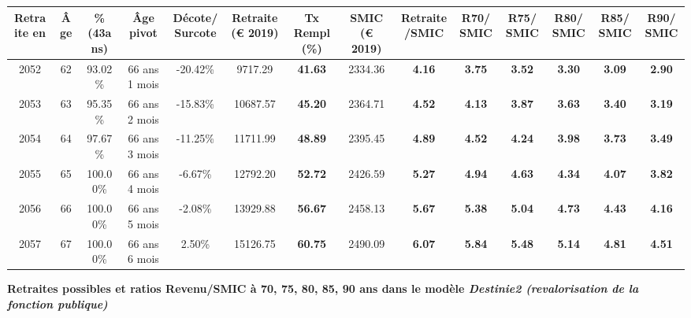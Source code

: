 \begin{adjustbox}{max width=\textwidth} 
\begin{tabular}[htb]{|c|c||c|c|c||c|c||c|c||c|c|c|c|c|} 
\hline 
 Retraite en &  Âge &  \%(43ans) &  Âge pivot &  Décote/Surcote &  Retraite (\euro{} 2019) &  Tx Rempl(\%) &  SMIC (\euro{} 2019) &  Retraite/SMIC &  R70/SMIC &  R75/SMIC &  R80/SMIC &  R85/SMIC &  R90/SMIC \\ 
\hline \hline 
 2052 &  62 &  93.02\% &  66 ans 1 mois &  -20.42\% &  9717.29 &  {\bf 41.63} &  2334.36 &  {\bf 4.16} &  {\bf 3.75} &  {\bf 3.52} &  {\bf 3.30} &  {\bf 3.09} &  {\bf 2.90} \\ 
\hline 
 2053 &  63 &  95.35\% &  66 ans 2 mois &  -15.83\% &  10687.57 &  {\bf 45.20} &  2364.71 &  {\bf 4.52} &  {\bf 4.13} &  {\bf 3.87} &  {\bf 3.63} &  {\bf 3.40} &  {\bf 3.19} \\ 
\hline 
 2054 &  64 &  97.67\% &  66 ans 3 mois &  -11.25\% &  11711.99 &  {\bf 48.89} &  2395.45 &  {\bf 4.89} &  {\bf 4.52} &  {\bf 4.24} &  {\bf 3.98} &  {\bf 3.73} &  {\bf 3.49} \\ 
\hline 
 2055 &  65 &  100.00\% &  66 ans 4 mois &  -6.67\% &  12792.20 &  {\bf 52.72} &  2426.59 &  {\bf 5.27} &  {\bf 4.94} &  {\bf 4.63} &  {\bf 4.34} &  {\bf 4.07} &  {\bf 3.82} \\ 
\hline 
 2056 &  66 &  100.00\% &  66 ans 5 mois &  -2.08\% &  13929.88 &  {\bf 56.67} &  2458.13 &  {\bf 5.67} &  {\bf 5.38} &  {\bf 5.04} &  {\bf 4.73} &  {\bf 4.43} &  {\bf 4.16} \\ 
\hline 
 2057 &  67 &  100.00\% &  66 ans 6 mois &  2.50\% &  15126.75 &  {\bf 60.75} &  2490.09 &  {\bf 6.07} &  {\bf 5.84} &  {\bf 5.48} &  {\bf 5.14} &  {\bf 4.81} &  {\bf 4.51} \\ 
\hline 
\hline 
\end{tabular} 
\end{adjustbox} 
 
 \vspace{0.1cm} 
{\bf \noindent Retraites possibles et ratios Revenu/SMIC à 70, 75, 80, 85, 90 ans dans le modèle \emph{Destinie2 (revalorisation de la fonction publique)}}  
 
